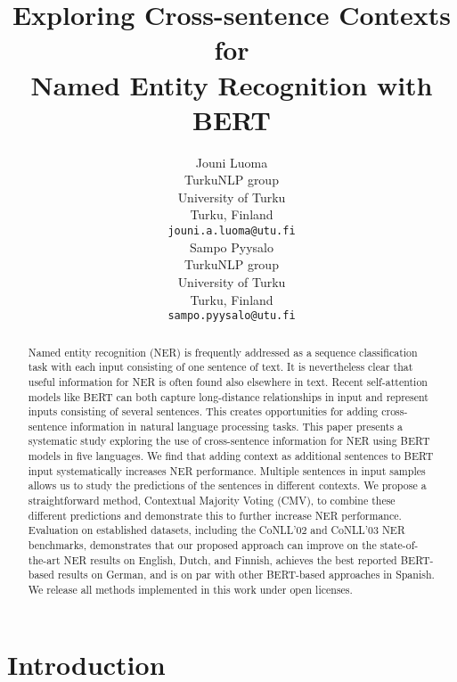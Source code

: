 \documentclass[11pt]{article}
\title{Exploring Cross-sentence Contexts for\\Named Entity Recognition with BERT}
\author{Jouni Luoma \\
  TurkuNLP group \\
  University of Turku \\
  Turku, Finland \\
  {\tt jouni.a.luoma@utu.fi} \\\And
  Sampo Pyysalo \\
  TurkuNLP group \\
  University of Turku \\
  Turku, Finland \\
  {\tt sampo.pyysalo@utu.fi} \\}
\date{}
\begin{document}
\maketitle
\begin{abstract}
Named entity recognition (NER) is frequently addressed as a sequence classification task with each input consisting of one sentence of text. It is nevertheless clear that useful information for NER is often found also elsewhere in text. Recent self-attention models like BERT can both capture long-distance relationships in input and represent inputs consisting of several sentences. This creates opportunities for adding cross-sentence information in natural language processing tasks. This paper presents a systematic study exploring the use of cross-sentence information for NER using BERT models in five languages. We find that adding context as additional sentences to BERT input systematically increases NER performance. Multiple sentences in input samples allows us to study the predictions of the sentences in different contexts. We propose a straightforward method, Contextual Majority Voting (CMV), to combine these different predictions and demonstrate this to further increase NER performance. Evaluation on established datasets, including the CoNLL'02 and CoNLL'03 NER benchmarks, demonstrates that our proposed approach can improve on the state-of-the-art NER results on English, Dutch, and Finnish, achieves the best reported BERT-based results on German, and is on par with other BERT-based approaches in Spanish. We release all methods implemented in this work under open licenses.

\end{abstract}

\section{Introduction}
\label{intro}
\end{document}
